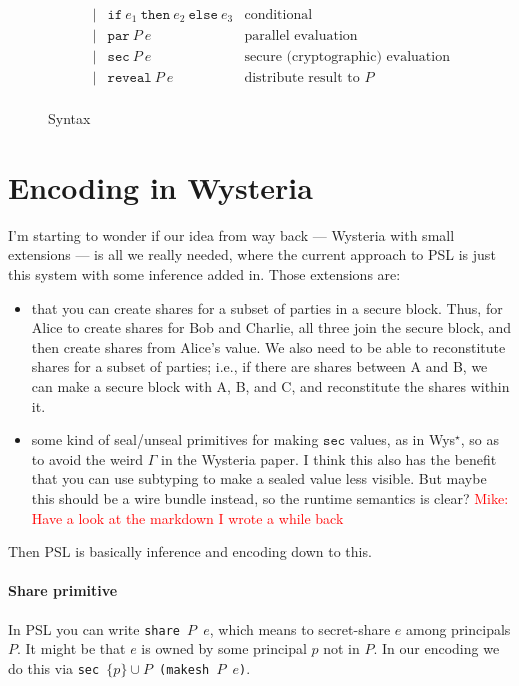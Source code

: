 \documentclass[10pt]{article}
\newcommand{\kw}[1]{\ensuremath{\mathtt{#1}}}
\newcommand{\ssec}{\ensuremath{\mathtt{sec}}}
\newcommand{\epar}[2]{\ensuremath{\kw{par}~{#1}~{#2}}}
\newcommand{\esec}[2]{\ensuremath{\kw{sec}~{#1}~{#2}}}
\newcommand{\ereveal}[2]{\ensuremath{\kw{reveal}~{#1}~{#2}}}
\newcommand{\econd}[3]{\ensuremath{\kw{if}~{#1}~\kw{then}~{#2}~\kw{else}~{#3}}}
\newcommand{\mwh}[1]{\textcolor{red}{Mike: #1}}
\begin{document}
\begin{figure}[h]
\[\begin{array}{rlcll}
                       && \mid & \econd{e_1}{e_2}{e_3}  & \text{conditional} \\
                       && \mid & \epar{P}{e} & \text{parallel evaluation}\\
                       && \mid & \esec{P}{e} & \text{secure (cryptographic) evaluation}\\
                       && \mid & \ereveal{P}{e} & \text{distribute result to $P$}\\
  \end{array}
  \]
  \caption{Syntax}
  \label{fig:syntax}
\end{figure}

\section{Encoding in Wysteria}

I'm starting to wonder if our idea from way back --- Wysteria with
small extensions --- is all we really needed, where the current approach
to PSL is just this system with some inference added in. Those
extensions are:
\begin{itemize}
\item that you can create shares for a subset of parties in a secure
  block. Thus, for Alice to create shares for Bob and Charlie, all
  three join the secure block, and then create shares from Alice's
  value. We also need to be able to reconstitute shares for a subset
  of parties; i.e., if there are shares between A and B, we can make a
  secure block with A, B, and C, and reconstitute the shares within
  it. 
\item some kind of seal/unseal primitives for making $\ssec$ values, as
in Wys$^\star$, so as to avoid the weird $\Gamma$ in the Wysteria
paper. I think this also has the benefit that you can use subtyping to
make a sealed value less visible. But maybe this should be a wire
bundle instead, so the runtime semantics is clear?
\mwh{Have a look at the markdown I wrote a while back}
\end{itemize}

Then PSL is basically inference and encoding down to this.

\paragraph{Share primitive} In PSL you can write \texttt{share $P$
  $e$}, which means to secret-share $e$ among principals $P$. It might
be that $e$ is owned by some principal $p$ not in $P$. In our encoding
we do this via \texttt{sec $\{p\}\cup{P}$ (makesh $P$ $e$)}.
\end{document}
